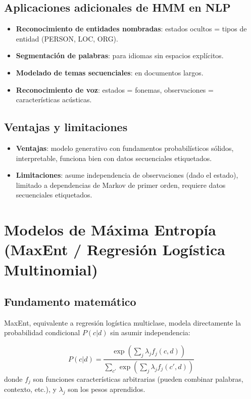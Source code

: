 \documentclass[12pt,a4paper,openany,oneside]{book}
\begin{document}
\subsection{Aplicaciones adicionales de HMM en NLP}
\begin{itemize}
    \item \textbf{Reconocimiento de entidades nombradas}: estados ocultos = tipos de entidad (PERSON, LOC, ORG).
    \item \textbf{Segmentación de palabras}: para idiomas sin espacios explícitos.
    \item \textbf{Modelado de temas secuenciales}: en documentos largos.
    \item \textbf{Reconocimiento de voz}: estados = fonemas, observaciones = características acústicas.
\end{itemize}

\subsection{Ventajas y limitaciones}
\begin{itemize}
    \item \textbf{Ventajas}: modelo generativo con fundamentos probabilísticos sólidos, interpretable, funciona bien con datos secuenciales etiquetados.
    \item \textbf{Limitaciones}: asume independencia de observaciones (dado el estado), limitado a dependencias de Markov de primer orden, requiere datos secuenciales etiquetados.
\end{itemize}

\section{Modelos de Máxima Entropía (MaxEnt / Regresión Logística Multinomial)}

\subsection{Fundamento matemático}
MaxEnt, equivalente a regresión logística multiclase, modela directamente la probabilidad condicional \(P(c|d)\) sin asumir independencia:

\[
P(c|d) = \frac{\exp\left(\sum_j \lambda_j f_j(c,d)\right)}{\sum_{c'} \exp\left(\sum_j \lambda_j f_j(c',d)\right)}
\]
donde \(f_j\) son funciones características arbitrarias (pueden combinar palabras, contexto, etc.), y \(\lambda_j\) son los pesos aprendidos.
\end{document}
